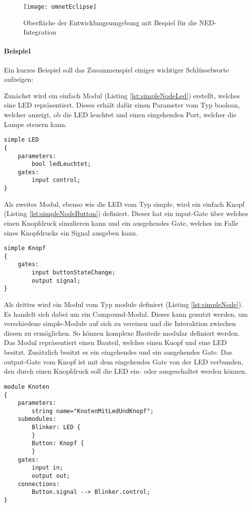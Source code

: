 \begin{figure}[htbp]
\centering
\caption{Oberfläche der Entwicklungsumgebung mit Bespiel für die NED-Integration}
\label{fig:messageEvent}
\texttt{[image: omnetEclipse]}
\end{figure}

\paragraph{Beispiel} Ein kurzes Beispiel soll das Zusammenspiel einiger wichtiger Schlüsselworte aufzeigen:

Zunächst wird ein einfach Modul (Listing \ref{lst:simpleNodeLed}) erstellt, welches eine LED repräsentiert. Dieses erhält dafür einen Parameter vom Typ boolean, welcher anzeigt, ob die LED leuchtet und einen eingehenden Port, welcher die Lampe steuern kann. 
\begin{lstlisting}[language=ned,caption={einfaches Modul: LED},label=lst:simpleNodeLed]
simple LED
{
	parameters:
		bool ledLeuchtet;
	gates:
		input control;
}
\end{lstlisting}

Als zweites Modul, ebenso wie die LED vom Typ simple, wird ein einfach Knopf (Listing \ref{lst:simpleNodeButton}) definiert. Dieser hat ein input-Gate über welches einen Knopfdruck simulieren kann und ein ausgehendes Gate, welches im Falle eines Knopfdrucks ein Signal ausgeben kann.
\begin{lstlisting}[language=ned,caption={einfaches Modul: Knopf},label=lst:simpleNodeButton]
simple Knopf
{
	gates:
		input buttonStateChange;
		output signal;
}
\end{lstlisting}

Als drittes wird ein Modul vom Typ module definiert (Listing \ref{lst:simpleNode}). Es handelt sich dabei um ein Compound-Modul. Dieses kann genutzt werden, um verschiedene simple-Module auf sich zu vereinen und die Interaktion zwischen diesen zu ermöglichen. So können komplexe Bauteile modular definiert werden.\\
Das Modul repräsentiert einen Bauteil, welches einen Knopf und eine LED besitzt. Zusätzlich besitzt es ein eingehendes und ein ausgehendes Gate. Das output-Gate vom Knopf ist mit dem eingehendes Gate von der LED verbunden, den durch einen Knopfdruck soll die LED ein- oder ausgeschaltet werden können.
\begin{lstlisting}[language=ned,caption={Compound Modul},label=lst:simpleNode]
module Knoten
{
	parameters:
		string name="KnotenMitLedUndKnopf";
	submodules:
		Blinker: LED {
		}
		Button: Knopf {
		}
	gates:
		input in;
		output out;
	connections:
		Button.signal --> Blinker.control;
}
\end{lstlisting}

